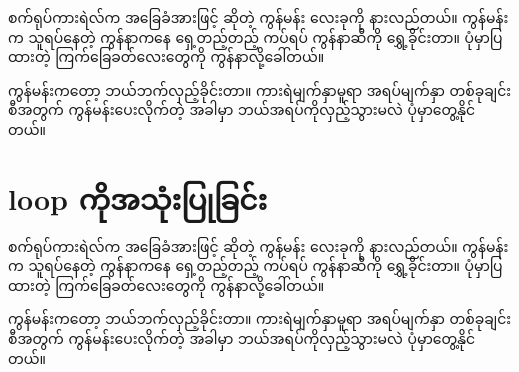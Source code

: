 \begin{sloppypar}
စက်ရုပ်ကားရဲလ်က အခြေခံအားဖြင့်  ဆိုတဲ့ ကွန်မန်း လေးခုကို နားလည်တယ်။  ကွန်မန်းက သူရပ်နေတဲ့ ကွန်နာကနေ ရှေ့တည့်တည့် ကပ်ရပ် ကွန်နာဆီကို ရွှေ့ခိုင်းတာ။ ပုံမှာပြထားတဲ့ ကြက်ခြေခတ်လေးတွေကို ကွန်နာလို့ခေါ်တယ်။ 

 ကွန်မန်းကတော့ ဘယ်ဘက်လှည့်ခိုင်းတာ။ ကားရဲမျက်နှာမူရာ အရပ်မျက်နှာ တစ်ခုချင်းစီအတွက်  ကွန်မန်းပေးလိုက်တဲ့ အခါမှာ ဘယ်အရပ်ကိုလှည့်သွားမလဲ ပုံမှာတွေ့နိုင်တယ်။
\section{{} loop ကိုအသုံးပြုခြင်း}

စက်ရုပ်ကားရဲလ်က အခြေခံအားဖြင့်  ဆိုတဲ့ ကွန်မန်း လေးခုကို နားလည်တယ်။  ကွန်မန်းက သူရပ်နေတဲ့ ကွန်နာကနေ ရှေ့တည့်တည့် ကပ်ရပ် ကွန်နာဆီကို ရွှေ့ခိုင်းတာ။ ပုံမှာပြထားတဲ့ ကြက်ခြေခတ်လေးတွေကို ကွန်နာလို့ခေါ်တယ်။ 

 ကွန်မန်းကတော့ ဘယ်ဘက်လှည့်ခိုင်းတာ။ ကားရဲမျက်နှာမူရာ အရပ်မျက်နှာ တစ်ခုချင်းစီအတွက်  ကွန်မန်းပေးလိုက်တဲ့ အခါမှာ ဘယ်အရပ်ကိုလှည့်သွားမလဲ ပုံမှာတွေ့နိုင်တယ်။

\end{sloppypar}
